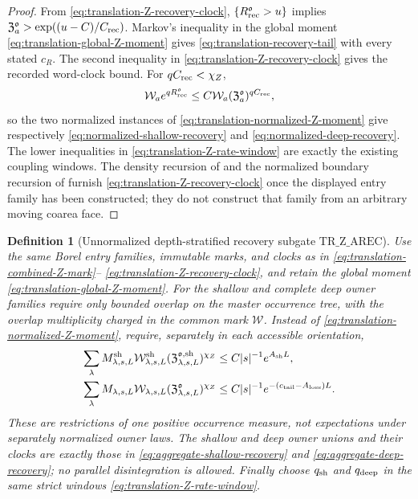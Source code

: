 \documentclass[11pt]{article}
\newtheorem{definition}[theorem]{Definition}
\begin{document}
\begin{proof}
From \eqref{eq:translation-Z-recovery-clock},
$\{R_{\rm rec}^{\mathfrak o}>u\}$ implies
$\mathfrak Z_a^{\mathfrak o}>
\exp((u-C)/C_{\rm rec})$.  Markov's inequality in the global moment
\eqref{eq:translation-global-Z-moment} gives
\eqref{eq:translation-recovery-tail} with every stated $c_R$.  The second
inequality in \eqref{eq:translation-Z-recovery-clock} gives the recorded
word-clock bound.  For $qC_{\rm rec}<\chi_Z$,
\[
 \mathcal W_ae^{qR_{\rm rec}^{\mathfrak o}}
 \le C\mathcal W_a
 (\mathfrak Z_a^{\mathfrak o})^{qC_{\rm rec}},
\]
so the two normalized instances of
\eqref{eq:translation-normalized-Z-moment} give respectively
\eqref{eq:normalized-shallow-recovery} and
\eqref{eq:normalized-deep-recovery}.  The lower inequalities in
\eqref{eq:translation-Z-rate-window} are exactly the existing coupling
windows.  The density recursion of \cite[Lemma~13]{SYZ} and the normalized
boundary recursion of \cite[Lemma~16]{SYZ} furnish
\eqref{eq:translation-Z-recovery-clock} once the displayed entry family has
been constructed; they do not construct that family from an arbitrary
moving coarea face.
\end{proof}

\begin{definition}[Unnormalized depth-stratified recovery subgate
$\mathrm{TR\_Z\_AREC}$]
\label{def:translation-Z-aggregate-recovery}
Use the same Borel entry families, immutable marks, and clocks as in
\eqref{eq:translation-combined-Z-mark}--
\eqref{eq:translation-Z-recovery-clock}, and retain the global moment
\eqref{eq:translation-global-Z-moment}.  For the shallow and complete deep
owner families require only bounded overlap on the master occurrence tree,
with the overlap multiplicity charged in the common mark $\mathcal W$.
Instead of \eqref{eq:translation-normalized-Z-moment}, require, separately
in each accessible orientation,
\begin{align}
 \sum_\lambda M^{\rm sh}_{\lambda,s,L}
  \mathcal W^{\rm sh}_{\lambda,s,L}
  (\mathfrak Z^{\mathfrak o,\rm sh}_{\lambda,s,L})^{\chi_Z}
 &\le C|s|^{-1}e^{A_{\rm sh}L},
 \label{eq:translation-aggregate-shallow-Z-moment}\\
 \sum_\lambda M_{\lambda,s,L}
  \mathcal W_{\lambda,s,L}
  (\mathfrak Z^{\mathfrak o}_{\lambda,s,L})^{\chi_Z}
 &\le C|s|^{-1}
 e^{-(c_{\rm tail}-A_{\rm loss})L}.
 \label{eq:translation-aggregate-deep-Z-moment}
\end{align}
These are restrictions of one positive occurrence measure, not expectations
under separately normalized owner laws.  The shallow and deep owner unions
and their clocks are exactly those in
\eqref{eq:aggregate-shallow-recovery} and
\eqref{eq:aggregate-deep-recovery}; no parallel disintegration is allowed.
Finally choose $q_{\rm sh}$ and $q_{\rm deep}$ in the same strict windows
\eqref{eq:translation-Z-rate-window}.
\end{definition}
\end{document}
